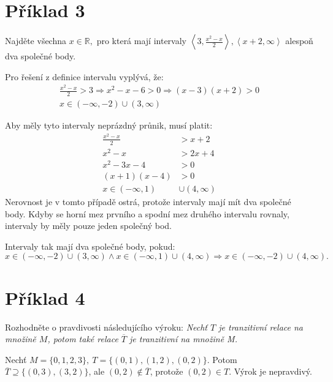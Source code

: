 \documentclass[12pt,a4paper]{article}
\newcommand{\pageline}{\noindent\makebox[\linewidth]{\rule{\linewidth}{0.4pt}}\vspace{5pt}}
\begin{document}
\newpage

\section*{Příklad 3}
Najděte všechna $x \in \mathbb{R},$ pro která mají intervaly \(\left\langle 3, \frac{x^2-x}{2} \right\rangle, \left\langle x+2, \infty \right\rangle \) alespoň dva společné body.
\pageline

Pro řešení z definice intervalu vyplývá, že:
\begin{gather*}
\frac{x^2-x}{2}>3 \Rightarrow x^2-x-6>0 \Rightarrow (x-3)(x+2)>0 \\
x \in \left(-\infty , -2\right) \cup \left(3, \infty \right)
\end{gather*}

Aby měly tyto intervaly neprázdný průnik, musí platit:
\begin{align*}
\frac{x^2-x}{2}&>x+2 \\
x^2-x&>2x+4 \\
x^2-3x-4&>0 \\
(x+1)(x-4)&>0 \\
x \in \left(-\infty , 1\right) &\cup \left(4, \infty \right)
\end{align*}
Nerovnost je v tomto případě ostrá, protože intervaly mají mít dva společné body. Kdyby se horní mez prvního a spodní mez druhého intervalu rovnaly, intervaly by měly pouze jeden společný bod.

Intervaly tak mají dva společné body, pokud:
\[
x \in \left(-\infty , -2\right) \cup \left(3, \infty \right) \land x \in \left(-\infty , 1\right) \cup \left(4, \infty \right) \Rightarrow x \in \left(-\infty , -2\right) \cup \left(4, \infty \right).
\]

\newpage
\section*{Příklad 4}
Rozhodněte o pravdivosti následujícího výroku:
\textit{Nechť $T$ je tranzitivní relace na množině $M$, potom také relace $\overline{T}$ je
tranzitivní na množině M.}

\pageline

Nechť \(M=\{0,1,2,3\},\ T=\{(0,1), (1,2), (0,2)\}\). Potom \(\overline{T}\supseteq \{(0,3),(3,2)\}\), ale \((0,2)\notin \overline{T}\), protože \((0,2)\in T\). Výrok je nepravdivý.
\end{document}
